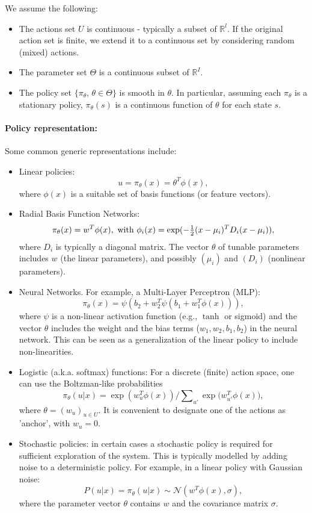 We assume the following:
\begin{itemize}
  \item The actions set $U$ is continuous - typically a subset of $\mathbb R^l$.
If the original action set is finite, we extend it to a continuous set by considering  random (mixed) actions.
  \item The parameter set $\Theta $ is a continuous subset of $\mathbb R^I$.
  \item The policy set $\{ {\pi _\theta },\,\theta  \in \Theta \} $ is smooth in $\theta $. In particular, assuming each ${\pi _\theta }$ is a stationary policy,  ${\pi _\theta }(s)$ is a continuous function of $\theta $ for each state $s$.
\end{itemize}

\paragraph{Policy representation:} Some common generic representations include:
\begin{itemize}
  \item Linear policies:
                                      $$u = {\pi _\theta }(x) = {\theta ^T}\phi (x),$$
where $\phi (x)$ is a suitable set of basis functions (or  feature vectors).
  \item Radial Basis Function Networks:
             $${\pi _\theta }(x) = {w^T}\phi (x),  \textrm{ with }  {\phi _i}(x) = \exp ( - {\textstyle{1 \over 2}}{(x - {\mu _i})^T}{D_i}(x - {\mu _i})),$$
where ${D_i}$ is typically a diagonal matrix. The vector $\theta $ of tunable parameters includes $w$ (the linear parameters), and possibly $({\mu _i})$ and $({D_i})$ (nonlinear parameters).
  \item Neural Networks. For example, a Multi-Layer Perceptron (MLP):
  $$
    {\pi _\theta }(x) = \psi(b_2 + w_2^T \psi(b_1 + {w_1^T}\phi (x))),
  $$
  where $\psi$ is a non-linear activation function (e.g., $\tanh$ or sigmoid) and the vector $\theta$ includes the weight and the bias terms ($w_1,w_2,b_1,b_2$) in the neural network. This can be seen as a generalization of the linear policy to include non-linearities.
  \item Logistic (a.k.a. softmax) functions: For a discrete (finite) action space, one can use the Boltzman-like probabilities
                           $${\pi _\theta }(u|x) = \exp (w_u^T\phi (x))/\sum\nolimits_{u'} {\exp (w_{u'}^T\phi (x)} ),$$
where  $\theta  = {({w_u})_{u \in U}}$. It is convenient to designate one of the actions as 'anchor', with ${w_u} = 0$.
\item Stochastic policies: in certain cases a stochastic policy is required for sufficient exploration of the system. This is typically modelled by adding noise to a deterministic policy. For example, in a linear policy with Gaussian noise:
$$
P(u|x) = {\pi _\theta }(u|x) \sim \mathcal{N}\left( {w ^T}\phi (x), \sigma \right),
$$
where the parameter vector $\theta$ contains $w$ and the covariance matrix $\sigma$.
\end{itemize}

